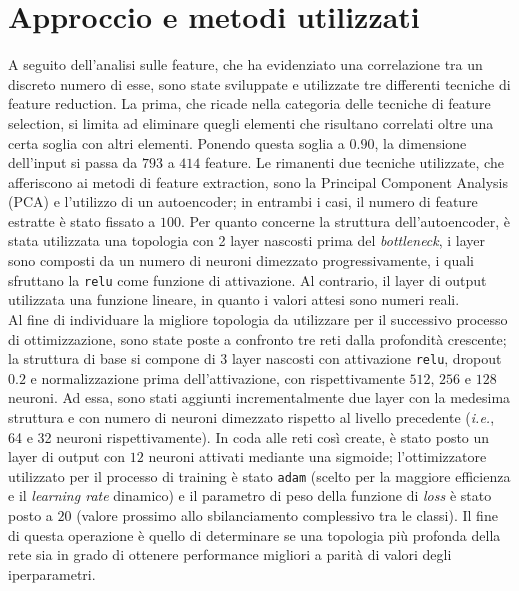 \section{Approccio e metodi utilizzati}
A seguito dell'analisi sulle feature, che ha evidenziato una correlazione tra un discreto numero di esse, sono state sviluppate e utilizzate tre differenti tecniche di feature reduction. 
La prima, che ricade nella categoria delle tecniche di feature selection, si limita ad eliminare quegli elementi che risultano correlati oltre una certa soglia con altri elementi. 
Ponendo questa soglia a $0.90$, la dimensione dell'input si passa da $793$ a $414$ feature.
Le rimanenti due tecniche utilizzate, che afferiscono ai metodi di feature extraction, sono la Principal Component Analysis (PCA) e l'utilizzo di un autoencoder; in entrambi i casi, il numero di feature estratte è stato fissato a $100$.
Per quanto concerne la struttura dell'autoencoder, è stata utilizzata una topologia con 2 layer nascosti prima del \textit{bottleneck}, i layer sono composti da un numero di neuroni dimezzato progressivamente, i quali sfruttano la \texttt{relu} come funzione di attivazione. 
Al contrario, il layer di output utilizzata una funzione lineare, in quanto i valori attesi sono numeri reali.\\
Al fine di individuare la migliore topologia da utilizzare per il successivo processo di ottimizzazione, sono state poste a confronto tre reti dalla profondità crescente; la struttura di base si compone di $3$ layer nascosti con attivazione \texttt{relu}, dropout $0.2$ e normalizzazione prima dell'attivazione, con rispettivamente $512$, $256$ e $128$ neuroni. 
Ad essa, sono stati aggiunti incrementalmente due layer con la medesima struttura e con numero di neuroni dimezzato rispetto al livello precedente (\textit{i.e.}, 64 e 32 neuroni rispettivamente). 
In coda alle reti così create, è stato posto un layer di output con $12$ neuroni attivati mediante una sigmoide; l'ottimizzatore utilizzato per il processo di training è stato \texttt{adam} (scelto per la maggiore efficienza e il \textit{learning rate} dinamico) e il parametro di peso della funzione di \textit{loss} è stato posto a $20$ (valore prossimo allo sbilanciamento complessivo tra le classi). 
Il fine di questa operazione è quello di determinare se una topologia più profonda della rete  sia in grado di ottenere performance migliori a parità di valori degli iperparametri.

